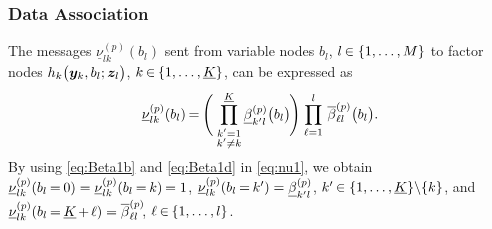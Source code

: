 \documentclass[10pt, twoside, romanappendices]{IEEEtran}
\providecommand{\ist}{\hspace*{.3mm}}
\providecommand{\rmv}{\hspace*{-.3mm}}
\providecommand{\nn}{\nonumber}
\begin{document}
\subsubsection{Data Association} \label{sec:dataAssociation}
The messages $\underline{\nu}^{(p)}_{l k}(b_l)$ sent from variable nodes $b_{l}$, $l \rmv\in \{1,\dots,M\}$ to factor nodes $h_k\big( \bm{y}_{k}, b_{l}; \bm{z}_l \big)$, $k \rmv\in\rmv \{1,\dots,\underline{K}\}$, can be \vspace{0mm}expressed as \cite[Eq.~(5)]{KscFreLoe:01}
\begin{align}
&\underline{\nu}^{(p)}_{l k}(b_l) \rmv=\rmv \Bigg( \ist \prod^{\underline{K}}_{\substack{k'=1\\k' \neq k}}  \underline{\beta}^{(p)}_{k' l}\big(b_{l}\big) \rmv \Bigg) \ist \prod^{l}_{\ell=1} \ist\ist \overline{\beta}^{(p)}_{\ell l}\big(b_{l}\big). 
  \label{eq:nu1}\\[-6mm]
&\nn
\end{align}
By using \eqref{eq:Beta1b} and \eqref{eq:Beta1d} in \eqref{eq:nu1}, we obtain $\underline{\nu}^{(p)}_{l k}(b_l \rmv=\rmv 0) = \underline{\nu}^{(p)}_{l k}(b_l \rmv=\rmv k) \rmv= 1$, $\underline{\nu}^{(p)}_{l k}(b_l \rmv=\rmv k') = \underline{\beta}^{(p)}_{k' l}$, $k' \rmv\in \{1,\dots,\underline{K}\} \backslash \{k\}$, and $\underline{\nu}^{(p)}_{l k}(b_l \rmv=\rmv \underline{K} \rmv+\rmv \ell) = \overline{\beta}^{(p)}_{\ell l}\rmv\rmv\rmv$, $\ell \rmv\in\rmv \{1,\dots,l\}$.
\end{document}
